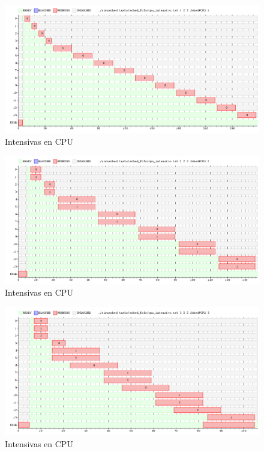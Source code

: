 \documentclass[11pt, a4paper, twoside]{article}
\begin{document}
\begin{figure}[H]
  \includegraphics [width=\textwidth]{../graficos/sched_fcfs/cpu_intensivo.png}
  \caption{Intensivas en CPU}
\end{figure}
\begin{figure}[H]
  \includegraphics [width=\textwidth]{../graficos/sched_fcfs/cpu_intensivo2.png}
  \caption{Intensivas en CPU}
  \label{fig:intensivas-2cpu}
\end{figure}
\begin{figure}[H]
  \includegraphics [width=\textwidth]{../graficos/sched_fcfs/cpu_intensivo3.png}
  \caption{Intensivas en CPU}
\end{figure}
\end{document}
